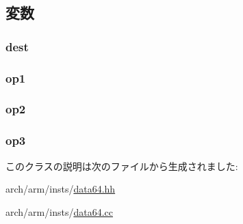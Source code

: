 \subsection{変数}
\hypertarget{classArmISA_1_1DataX3RegOp_aec72e8e45bdc87abeeeb75d2a8a9a716}{
\subsubsection[{dest}]{ {\bf dest}}}
\label{classArmISA_1_1DataX3RegOp_aec72e8e45bdc87abeeeb75d2a8a9a716}
\hypertarget{classArmISA_1_1DataX3RegOp_a4c465c43ad568f8bcf8ae71480e9cfea}{
\subsubsection[{op1}]{ {\bf op1}}}
\label{classArmISA_1_1DataX3RegOp_a4c465c43ad568f8bcf8ae71480e9cfea}
\hypertarget{classArmISA_1_1DataX3RegOp_a7799ff6cbe5a252199059eb8665820e7}{
\subsubsection[{op2}]{ {\bf op2}}}
\label{classArmISA_1_1DataX3RegOp_a7799ff6cbe5a252199059eb8665820e7}
\hypertarget{classArmISA_1_1DataX3RegOp_aeebae963914149e59062881eccc25c48}{
\subsubsection[{op3}]{ {\bf op3}}}
\label{classArmISA_1_1DataX3RegOp_aeebae963914149e59062881eccc25c48}


このクラスの説明は次のファイルから生成されました:\begin{DoxyCompactItemize}
\item 
arch/arm/insts/\hyperlink{data64_8hh}{data64.hh}\item 
arch/arm/insts/\hyperlink{data64_8cc}{data64.cc}\end{DoxyCompactItemize}
